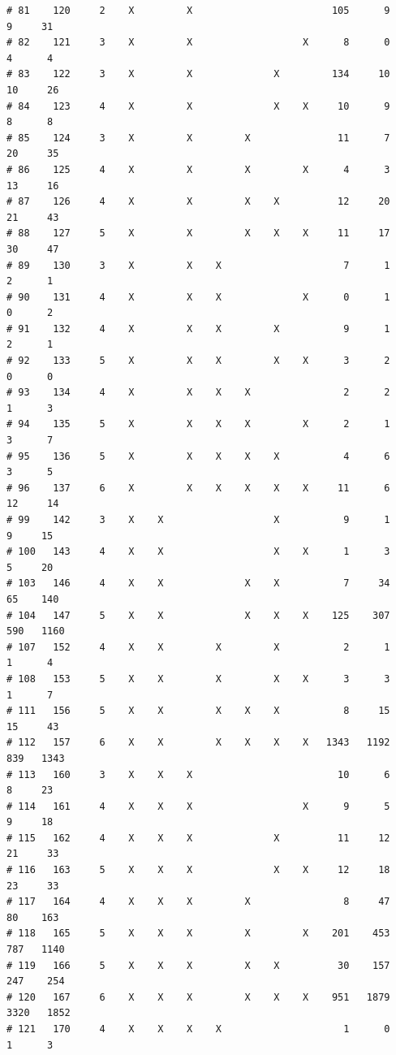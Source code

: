 \documentclass{article}\usepackage[]{graphicx}\usepackage[]{color}
\makeatletter
\newenvironment{kframe}{%
 \def\at@end@of@kframe{}%
 \ifinner\ifhmode%
  \def\at@end@of@kframe{\end{minipage}}%
  \begin{minipage}{\columnwidth}%
 \fi\fi%
 \def\FrameCommand##1{\hskip\@totalleftmargin \hskip-\fboxsep
 \colorbox{shadecolor}{##1}\hskip-\fboxsep
     \hskip-\linewidth \hskip-\@totalleftmargin \hskip\columnwidth}%
 \MakeFramed {\advance\hsize-\width
   \@totalleftmargin\z@ \linewidth\hsize
   \@setminipage}}%
 {\par\unskip\endMakeFramed%
 \at@end@of@kframe}
\newenvironment{knitrout}{}{} %
\makeatother
\begin{document}
\begin{knitrout}
\begin{kframe}
\begin{verbatim}
# 81    120     2    X         X                        105      9      9     31
# 82    121     3    X         X                   X      8      0      4      4
# 83    122     3    X         X              X         134     10     10     26
# 84    123     4    X         X              X    X     10      9      8      8
# 85    124     3    X         X         X               11      7     20     35
# 86    125     4    X         X         X         X      4      3     13     16
# 87    126     4    X         X         X    X          12     20     21     43
# 88    127     5    X         X         X    X    X     11     17     30     47
# 89    130     3    X         X    X                     7      1      2      1
# 90    131     4    X         X    X              X      0      1      0      2
# 91    132     4    X         X    X         X           9      1      2      1
# 92    133     5    X         X    X         X    X      3      2      0      0
# 93    134     4    X         X    X    X                2      2      1      3
# 94    135     5    X         X    X    X         X      2      1      3      7
# 95    136     5    X         X    X    X    X           4      6      3      5
# 96    137     6    X         X    X    X    X    X     11      6     12     14
# 99    142     3    X    X                   X           9      1      9     15
# 100   143     4    X    X                   X    X      1      3      5     20
# 103   146     4    X    X              X    X           7     34     65    140
# 104   147     5    X    X              X    X    X    125    307    590   1160
# 107   152     4    X    X         X         X           2      1      1      4
# 108   153     5    X    X         X         X    X      3      3      1      7
# 111   156     5    X    X         X    X    X           8     15     15     43
# 112   157     6    X    X         X    X    X    X   1343   1192    839   1343
# 113   160     3    X    X    X                         10      6      8     23
# 114   161     4    X    X    X                   X      9      5      9     18
# 115   162     4    X    X    X              X          11     12     21     33
# 116   163     5    X    X    X              X    X     12     18     23     33
# 117   164     4    X    X    X         X                8     47     80    163
# 118   165     5    X    X    X         X         X    201    453    787   1140
# 119   166     5    X    X    X         X    X          30    157    247    254
# 120   167     6    X    X    X         X    X    X    951   1879   3320   1852
# 121   170     4    X    X    X    X                     1      0      1      3

\end{verbatim}
\end{kframe}
\end{knitrout}
\end{document}
